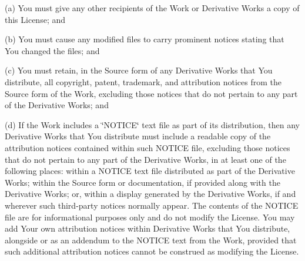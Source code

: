 \begin{DoxyEnumerate}
(a) You must give any other recipients of the Work or Derivative Works a copy of this License; and

(b) You must cause any modified files to carry prominent notices stating that You changed the files; and

(c) You must retain, in the Source form of any Derivative Works that You distribute, all copyright, patent, trademark, and attribution notices from the Source form of the Work, excluding those notices that do not pertain to any part of the Derivative Works; and

(d) If the Work includes a \char`\"{}\+NOTICE\char`\"{} text file as part of its distribution, then any Derivative Works that You distribute must include a readable copy of the attribution notices contained within such NOTICE file, excluding those notices that do not pertain to any part of the Derivative Works, in at least one of the following places\+: within a NOTICE text file distributed as part of the Derivative Works; within the Source form or documentation, if provided along with the Derivative Works; or, within a display generated by the Derivative Works, if and wherever such third-\/party notices normally appear. The contents of the NOTICE file are for informational purposes only and do not modify the License. You may add Your own attribution notices within Derivative Works that You distribute, alongside or as an addendum to the NOTICE text from the Work, provided that such additional attribution notices cannot be construed as modifying the License.


\end{DoxyEnumerate}
